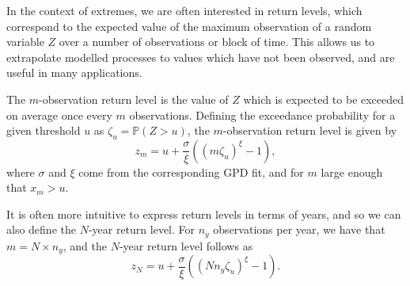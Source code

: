 \documentclass{article}
\numberwithin{equation}{section}
\begin{document}

In the context of extremes, we are often interested in return levels, which correspond to the expected value of the maximum observation of a random variable $Z$ over a number of observations or block of time.
This allows us to extrapolate modelled processes to values which have not been observed, and are useful in many applications.

The $m$-observation return level is the value of $Z$ which is expected to be exceeded on average once every $m$ observations.
Defining the exceedance probability for a given threshold $u$ as $\zeta_u = \mathbb{P}(Z > u)$, the $m$-observation return level is given by
\begin{equation} \label{eq:m_obs_return}
  z_m = u + \frac{\sigma}{\xi}\left(\left(m \zeta_u \right)^{\xi} - 1\right),
\end{equation}
where $\sigma$ and $\xi$ come from the corresponding GPD fit, and for $m$ large enough that $x_m > u$. 

It is often more intuitive to express return levels in terms of years, and so we can also define the $N$-year return level.
For $n_y$ observations per year, we have that $m = N \times n_y$, and the $N$-year return level follows as
\begin{equation} \label{eq:n_year_return}
  z_N = u + \frac{\sigma}{\xi}\left(\left(N n_y \zeta_u \right)^{\xi} - 1\right). 
\end{equation}
\end{document}

